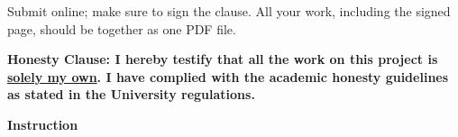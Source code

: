 %
%
%
\ifx\undefined\sol
Submit online; make sure to sign the clause. All your work, including the signed page, should be together as one PDF file.
\vspace{3em}
\else
{ \large
\textbf{Honesty Clause: {\color{red}I hereby testify that all the work on this project is \underline{solely my own}. I have complied with the academic honesty guidelines as stated in the University regulations.}}


\begin{Form}
\end{Form}
\begin{Form}
\end{Form}
}
\vspace{5em}
\fi

\textbf{Instruction}

